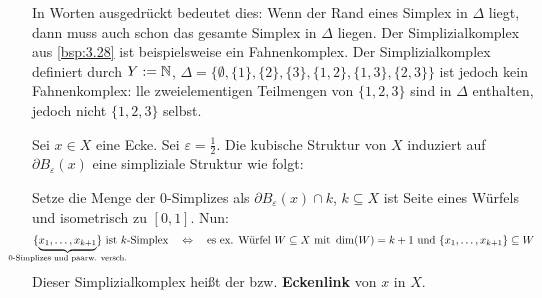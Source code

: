 In Worten ausgedrückt bedeutet dies:
Wenn der Rand eines Simplex in $\Delta$ liegt, dann muss auch schon das gesamte Simplex in $\Delta$ liegen.
Der Simplizialkomplex aus \autoref{bsp:3.28} ist beispielsweise ein Fahnenkomplex.
Der Simplizialkomplex definiert durch $Y:=\mathbb{N}$, $\Delta = \{\emptyset,\{1\},\{2\},\{3\},\{1,2\},\{1,3\},\{2,3\}\}$ ist jedoch kein Fahnenkomplex:
lle zweielementigen Teilmengen von $\{1,2,3\}$ sind in $\Delta$ enthalten, jedoch nicht $\{1,2,3\}$ selbst.
 
\begin{definition}
	\label{def:3.30}
	Sei $x \in X$ eine Ecke.
	Sei $\varepsilon = \frac{1}{2}$.
	Die kubische Struktur von $X$ induziert auf $\partial B_\varepsilon(x)$ eine simpliziale Struktur wie folgt:
	
	Setze die Menge der $0$-Simplizes als $\partial B_\varepsilon(x) \cap k$, $k \subseteq X$ ist Seite eines Würfels und isometrisch zu $[0,1]$.
	Nun:
	\[
		\{\Underbrace{x_1,\dots,x_{k+1}}{\mathclap{\text{0-Simplizes und paarw. versch.}}}\} \text{ ist } k \text{-Simplex} \quad \Leftrightarrow \quad \text{es ex. Würfel } W \subseteq X \text{ mit } \dim(W) = k+1 \text{ und } \{x_1,\dots,x_{k+1}\} \subseteq W
	\]
	Dieser Simplizialkomplex heißt der  bzw. \textbf{Eckenlink} von $x$ in $X$.
\end{definition}

